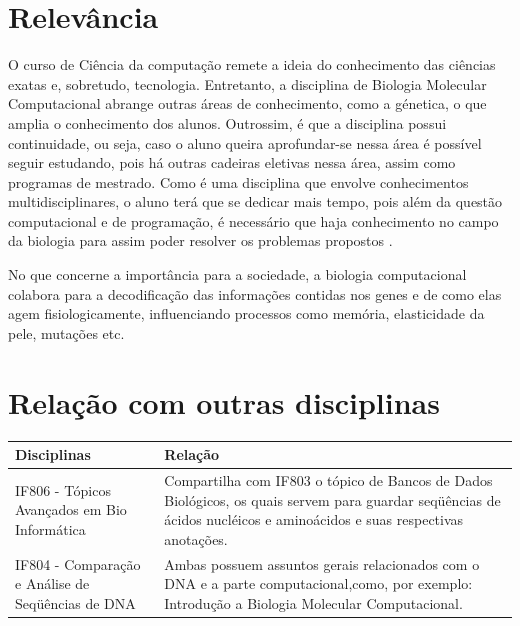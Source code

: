 \documentclass[10pt]{article}
\begin{document}
\section{Relevância}
\qquad O curso de Ciência da computação remete a ideia do conhecimento das ciências exatas e, sobretudo, tecnologia. Entretanto, a disciplina de Biologia Molecular Computacional abrange outras áreas de conhecimento, como a génetica, o que amplia o conhecimento dos alunos. Outrossim, é que a disciplina possui continuidade, ou seja, caso o aluno queira aprofundar-se nessa área é possível seguir estudando, pois há outras cadeiras eletivas nessa área, assim como programas de mestrado. Como é uma disciplina que envolve conhecimentos multidisciplinares, o aluno terá que se dedicar mais tempo, pois além da questão computacional e de programação, é necessário que haja conhecimento no campo da biologia para assim poder resolver os problemas propostos . 

No que concerne a importância para a sociedade, a biologia computacional colabora para a decodificação das informações contidas nos genes e de como elas agem fisiologicamente, influenciando processos como memória, elasticidade da pele, mutações etc.\cite{importancia}


\section{Relação com outras disciplinas}


\vspace{0.3cm}
\begin{tabular}{|p{3.0cm}|p{7.0cm}|}
\hline
Disciplinas & Relação\\
\hline


IF806 - Tópicos Avançados em Bio Informática &
Compartilha com IF803 o tópico de Bancos de Dados Biológicos, os quais servem para guardar seqüências de ácidos nucléicos e aminoácidos e suas respectivas anotações.\cite{IF806}\\
\hline 
IF804 - Comparação e Análise de Seqüências de DNA  & 
Ambas possuem  assuntos gerais relacionados com o DNA e a parte computacional,como, por exemplo: Introdução a Biologia Molecular Computacional. \cite{IF804}\\
\hline 





\end{tabular}



\end{document}
